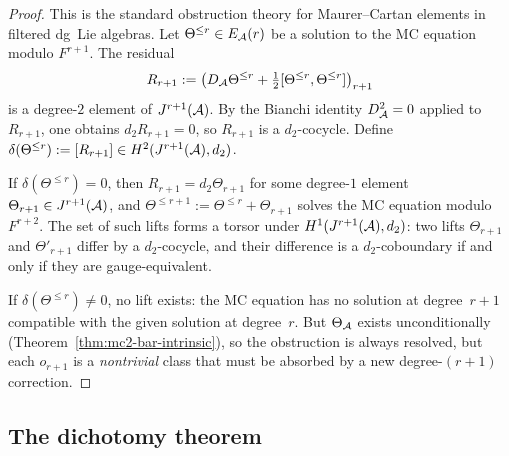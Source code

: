 \begin{proof}
This is the standard obstruction theory for
Maurer--Cartan elements in filtered dg~Lie algebras.
Let $\Theta^{\leq r} \in E_{\mathcal{A}}(r)$ be a solution to the
MC equation modulo $F^{r+1}$. The residual
\[
R_{r+1} :=
\bigl(D_{\mathcal{A}} \Theta^{\leq r}
+ \tfrac{1}{2}[\Theta^{\leq r}, \Theta^{\leq r}]\bigr)_{r+1}
\]
is a degree-$2$ element of $J^{r+1}(\mathcal{A})$.
By the Bianchi identity $D_{\mathcal{A}}^2 = 0$ applied to
$R_{r+1}$, one obtains $d_2 R_{r+1} = 0$, so
$R_{r+1}$ is a $d_2$-cocycle. Define
$\delta(\Theta^{\leq r}) := [R_{r+1}] \in
H^2(J^{r+1}(\mathcal{A}), d_2)$.

If $\delta(\Theta^{\leq r}) = 0$, then $R_{r+1} =
d_2 \Theta_{r+1}$ for some degree-$1$ element
$\Theta_{r+1} \in J^{r+1}(\mathcal{A})$, and
$\Theta^{\leq r+1} := \Theta^{\leq r} + \Theta_{r+1}$
solves the MC equation modulo $F^{r+2}$. The set of
such lifts forms a torsor under $H^1(J^{r+1}(\mathcal{A}), d_2)$:
two lifts $\Theta_{r+1}$ and $\Theta'_{r+1}$ differ by
a $d_2$-cocycle, and their difference is a
$d_2$-coboundary if and only if they are gauge-equivalent.

If $\delta(\Theta^{\leq r}) \neq 0$, no lift exists:
the MC equation has no solution at degree~$r{+}1$
compatible with the given solution at degree~$r$.
But $\Theta_{\mathcal{A}}$ exists unconditionally
(Theorem~\ref{thm:mc2-bar-intrinsic}), so the
obstruction is always resolved, but
each $o_{r+1}$ is a \emph{nontrivial} class that must
be absorbed by a new degree-$(r{+}1)$ correction.
\end{proof}


\subsection{The dichotomy theorem}
\label{subsec:dichotomy-theorem}


